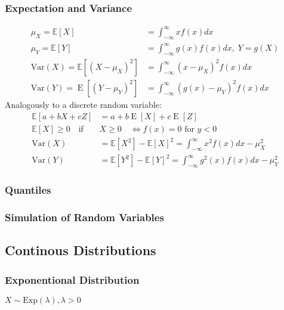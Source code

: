 \subsubsection{Expectation and Variance}
\noindent\begin{align*}
    \mu_X=\mathbb{E}[X]                                 & =\int_{-\infty}^{\infty}xf(x)dx                               \\
    \mu_Y=\mathbb{E}[Y]                                 & =\int_{-\infty}^{\infty}g(x)f(x)dx,\;Y=g(X)                   \\
    \mathrm{Var}(X)=\mathbb{E}[{(X-\mu_{X})}^{2}]       & =\int_{-\infty}^{\infty}{(x-\mu_{X})}^{2}f(x)dx               \\
    \mathrm{Var}(Y)=\operatorname{E}[{(Y-\mu_{Y})}^{2}] & =\int_{-\infty}^{\infty}{\left(g(x)-\mu_{Y}\right)}^{2}f(x)dx
\end{align*}
Analogously to a discrete random variable:
\noindent\begin{align*}
    \mathbb{E}[a+bX+cZ]               & =a+b\operatorname{E}[X]+c\operatorname{E}[Z]                                           \\
    \mathbb{E}[X]\geq0\quad\text{if } & X\geq0\quad\Leftrightarrow f(x) = 0 \text{ for } y<0                                   \\
    \mathrm{Var}(X)                   & =\mathbb{E}[X^{2}]-\mathbb{E}[X]^{2}=\int_{-\infty}^{\infty}x^{2}f(x)dx-\mu_{X}^{2}    \\
    \mathrm{Var}(Y)                   & =\mathbb{E}[Y^{2}]-\mathbb{E}[Y]^{2}=\int_{-\infty}^{\infty}g^{2}(x)f(x)dx-\mu_{Y}^{2}
\end{align*}

\subsubsection{Quantiles}

\subsubsection{Simulation of Random Variables}

\subsection{Continous Distributions}
\subsubsection{Exponentional Distribution}
$X \sim \mathrm{Exp}(\lambda), \lambda>0$

